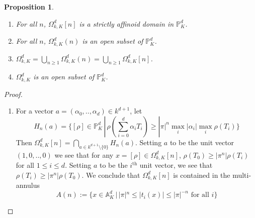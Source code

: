 \documentclass{amsart}
\theoremstyle{theorem}
\theoremstyle{lemma}
\theoremstyle{prop}
\newtheorem{prop}[lemma]{Proposition}
\theoremstyle{definition}
\theoremstyle{corollary}
\theoremstyle{remark}
\newcommand{\A}{\mathbb{A}}
\newcommand{\PR}{\mathbb{P}}
\begin{document}
\begin{prop} \label{open} 
\begin{enumerate}
\item For all $n$, $\Omega^{d}_{k,K}[n]$ is a strictly affinoid domain in $\PR^{d}_K$.
\item For all $n$, $\Omega^{d}_{k,K}(n)$ is an open subset of $\PR^{d}_K$.
\item $\Omega^{d}_{k,K} = \bigcup_{n \geq 1} \Omega^{d}_{k,K}(n) =  \bigcup_{n \geq 1} \Omega^{d}_{k,K}[n]$.
\item $\Omega^{d}_{k,K}$ is an open subset of $\PR^{d}_K$.
\end{enumerate}
\end{prop}
\begin{proof}
\begin{enumerate}
\item
For a vector $a=(\alpha_0, .., \alpha_d) \in k^{d+1}$, let
$$H_n(a)=\Big \{ [\rho] \in \PR^d_K \, | \, \rho(\sum_{i=0}^{d}\alpha_i T_i) \geq |\pi|^n   \max_i {|\alpha_i|}\max_i {\rho(T_i)} \Big \} $$ 
Then $\Omega^d_{k,K}[n]=\bigcap_{a\in k^{d+1}\setminus \{0 \}} H_n(a)$.
Setting $a$ to be the unit vector $(1,0,..,0)$ we see that for any $x=[\rho]\in \Omega^d_{k,K}[n]$, $\rho(T_0) \geq |\pi^n|\rho(T_i)$ for all $1 \leq i \leq d$. Setting $a$ to be the $i^\text{th}$ unit vector, we see that $\rho(T_i) \geq |\pi^n| \rho(T_0)$. We conclude that $\Omega^d_{k,K}[n]$ is contained in the multi-annulus
$$A(n):=\Big \{ x \in \A^d_K \, | \,  |\pi|^n \leq |t_i(x)| \leq |\pi|^{-n} \text{ for all } i\Big \} $$


\end{enumerate}
\end{proof}
\end{document}
